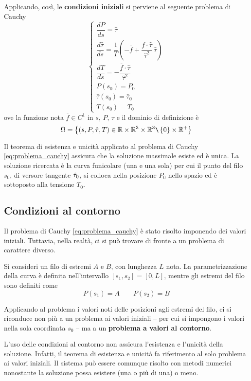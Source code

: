 Applicando, così, le \textbf{condizioni iniziali} si perviene al seguente problema di Cauchy
\begin{equation}
	\label{eq:problema_cauchy}
	\begin{cases}
		\dfrac{dP}{ds} = \hat{\tau}\\[1.5ex]
		\dfrac{d\hat{\tau}}{ds} = \dfrac{1}{T} \left(-\overline{f} + \dfrac{\overline{f}\cdot\hat{\tau}}{\hat{\tau}^2}\,\hat{\tau}\right)\\[1.5ex]
		\dfrac{dT}{ds} = -\dfrac{\overline{f}\cdot\hat{\tau}}{\hat{\tau}^2}\\[1.5ex]
		P(s_0) = P_0\\
		\hat{\tau}(s_0)= \hat{\tau}_0\\
		T(s_0)=T_0
	\end{cases}
\end{equation}
ove la funzione nota $\overline{f}\in C^1$ in $s$, $P$, $\hat{\tau}$ e il dominio di definizione è
\[
\Omega = \left\{(s, P, \hat{\tau}, T)\in \mathbb{R}\times\mathbb{R}^3\times \mathbb{R}^3\texttt{\textbackslash}\left\{0\right\}\times \mathbb{R}^+\right\}
\]

Il teorema di esistenza e unicità applicato al problema di Cauchy \eqref{eq:problema_cauchy} assicura che la soluzione massimale esiste ed è unica.
La soluzione ricercata è la curva funicolare (una e una sola) per cui il punto del filo $s_0$, di versore tangente $\hat{\tau}_0$, si colloca nella posizione $P_0$ nello spazio ed è sottoposto alla tensione $T_0$.

\subsection{Condizioni al contorno}\label{section:condizioni_contorno}
Il problema di Cauchy \eqref{eq:problema_cauchy} è stato risolto imponendo dei valori iniziali. Tuttavia, nella realtà, ci si può trovare di fronte a un problema di carattere diverso.

Si consideri un filo di estremi $A$ e $B$, con lunghezza $L$ nota. La parametrizzazione della curva è definita nell'intervallo $[s_1, s_2] = [0, L]$, mentre gli estremi del filo sono definiti come
\[
P(s_1)	= A \qquad P(s_2)=B
\]

Applicando al problema i valori noti delle posizioni agli estremi del filo, ci si riconduce non più a un problema ai valori iniziali -- per cui si impongono i valori nella sola coordinata $s_0$ -- ma a un \textbf{problema a valori al contorno}.

L'uso delle condizioni al contorno non assicura l'esistenza e l'unicità della soluzione. Infatti, il teorema di esistenza e unicità fa riferimento al solo problema ai valori iniziali. Il sistema può essere comunque risolto con metodi numerici nonostante la soluzione possa esistere (una o più di una) o meno.

